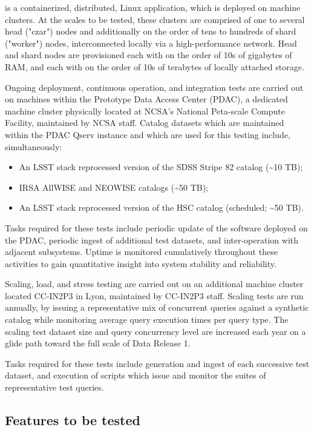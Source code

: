 \documentclass[DM,lsstdraft,STS,toc]{lsstdoc}
\begin{document}
\product{} is a containerized, distributed, Linux application, which is deployed on machine clusters.
At the scales to be tested, these clusters are comprised of one to several head ("czar") nodes and
additionally on the order of tens to hundreds of shard ("worker") nodes, interconnected locally via a
high-performance network. Head and shard nodes are provisioned each with on the order of 10s of gigabytes of
RAM, and each with on the order of 10s of terabytes of locally attached storage.

Ongoing deployment, continuous operation, and integration tests are carried out on machines within the
Prototype Data Access Center (PDAC), a dedicated machine cluster physically located at NCSA's National
Peta-scale Compute Facility, maintained by NCSA staff. Catalog datasets which are maintained within
the PDAC Qserv instance and which are used for this testing include, simultaneously:

\begin{itemize}
  \item{An LSST stack reprocessed version of the SDSS Stripe 82 catalog ({\textasciitilde{}}10 TB);}
  \item{IRSA AllWISE and NEOWISE catalogs ({\textasciitilde{}}50 TB);}
  \item{An LSST stack reprocessed version of the HSC catalog (scheduled; {\textasciitilde{}}50 TB).}
\end{itemize}

Tasks required for these tests include periodic update of the software deployed on the PDAC,
periodic ingest of additional test datasets, and inter-operation with adjacent subsystems.  Uptime
is monitored cumulatively throughout these activities to gain quantitative insight into system
stability and reliability.

Scaling, load, and stress testing are carried out on an additional machine cluster located
CC-IN2P3 in Lyon, maintained by CC-IN2P3 staff. Scaling tests are run annually, by issuing
a representative mix of concurrent queries against a synthetic catalog while monitoring
average query execution times per query type.  The scaling test dataset size and query
concurrency level are increased each year on a glide path toward the full scale of Data Release 1.

Tasks required for these tests include generation and ingest of each successive test dataset, and
execution of scripts which issue and monitor the suites of representative test queries.

\subsection{Features to be tested}
\label{sec:feat2test}
\end{document}
